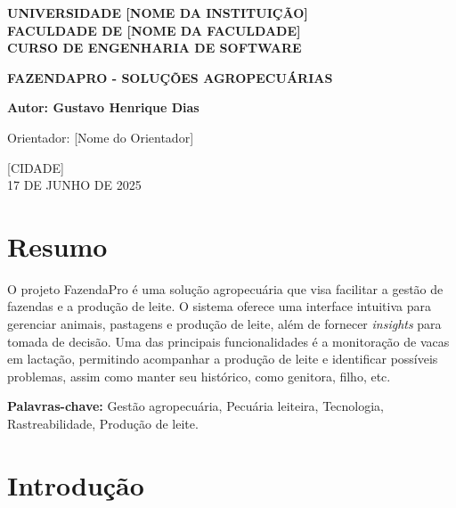 \documentclass[12pt, a4paper]{article}
\begin{document}
\begin{titlepage}
    \centering
    \vspace*{1cm}
    {\large\bfseries UNIVERSIDADE [NOME DA INSTITUIÇÃO]\\
    FACULDADE DE [NOME DA FACULDADE]\\
    CURSO DE ENGENHARIA DE SOFTWARE}\par
    \vspace{2cm}
    {\Large\bfseries FAZENDAPRO - SOLUÇÕES AGROPECUÁRIAS}\par
    \vspace{2cm}
    {\normalsize\bfseries Autor: Gustavo Henrique Dias}\par
    \vspace{1cm}
    {\normalsize Orientador: [Nome do Orientador]}\par
    \vspace{3cm}
    {\normalsize [CIDADE]\\
    17 DE JUNHO DE 2025}\par
\end{titlepage}

\tableofcontents
\newpage

\section*{Resumo}
\begin{spacing}{1.5}
O projeto FazendaPro é uma solução agropecuária que visa facilitar a gestão de fazendas e a produção de leite. O sistema oferece uma interface intuitiva para gerenciar animais, pastagens e produção de leite, além de fornecer \textit{insights} para tomada de decisão. Uma das principais funcionalidades é a monitoração de vacas em lactação, permitindo acompanhar a produção de leite e identificar possíveis problemas, assim como manter seu histórico, como genitora, filho, etc.
\end{spacing}
\vspace{0.5cm}
\textbf{Palavras-chave:} Gestão agropecuária, Pecuária leiteira, Tecnologia, Rastreabilidade, Produção de leite.
\newpage

\section{Introdução}
\end{document}
